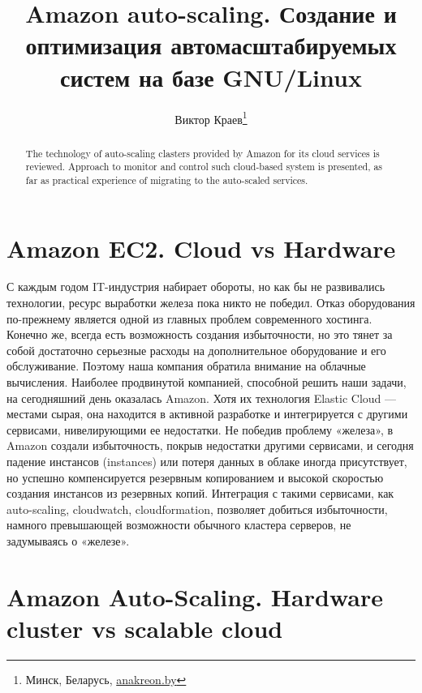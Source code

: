 \documentclass[10pt, a5paper]{article}
\begin{document}
\title{Amazon auto-scaling. Создание и оптимизация автомасштабируемых систем на базе GNU/Linux}
\author{Виктор Краев\footnote{Минск, Беларусь, \url{anakreon.by}}}
\date{}
\maketitle
\begin{abstract}\noindent 
The technology of auto-scaling clasters provided by Amazon for its cloud services is reviewed. Approach to monitor and control such cloud-based system is presented, as far as practical expe\-ri\-ence of migrating to the auto-scaled services.
\end{abstract}

\section*{Amazon EC2. Cloud vs Hardware}
С каждым годом IT-индустрия набирает обороты, но как бы не развивались технологии, ресурс выработки железа пока никто не победил. Отказ оборудования по-прежнему является одной из главных проблем современного хостинга. Конечно же, всегда есть возможность создания избыточности, но это тянет за собой достаточно серьезные расходы на дополнительное оборудование и его обслуживание. Поэтому наша компания обратила внимание на облачные вычисления. Наиболее продвинутой компанией, способной решить наши задачи, на сегодняшний день оказалась Amazon. Хотя их технология Elastic Cloud --- местами сырая, она находится в активной разработке и интегрируется с другими сервисами, нивелирующими ее недостатки. Не победив проблему «железа», в Amazon создали избыточность, покрыв недостатки другими сервисами, и сегодня падение инстансов (instances) или потеря данных в облаке иногда присутствует, но успешно компенсируется резервным копированием и высокой скоростью создания инстансов из резервных копий. Интеграция с такими сервисами, как auto-scaling, cloudwatch, cloudformation, позволяет добиться избыточности, намного превышающей возможности обычного кластера серверов, не задумываясь о «железе».  

\section*{Amazon Auto-Scaling. Hardware cluster vs scalable cloud}
\end{document}
